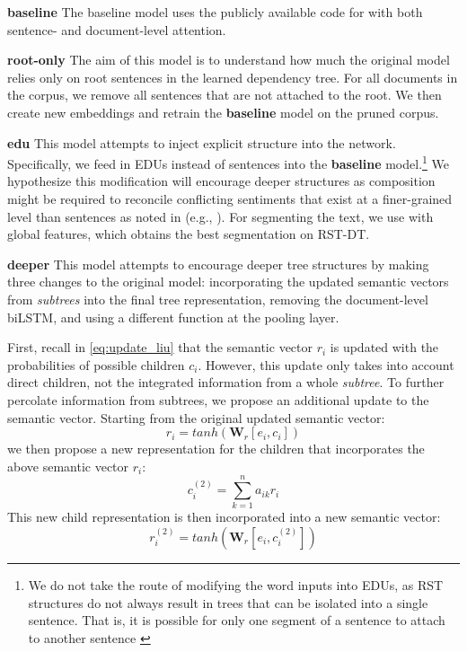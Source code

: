 \smallskip
\noindent\textbf{baseline} The baseline model uses the publicly available code for  with both sentence- and document-level attention. 

\smallskip
\noindent\textbf{root-only} The aim of this model is to understand how much the original model relies only on root sentences in the learned dependency tree. For all documents in the corpus, we remove all sentences that are not attached to the root. We then create new embeddings and retrain the \textbf{baseline} model on the pruned corpus.

\smallskip
\noindent\textbf{edu} This model attempts to inject explicit structure into the network. Specifically, we feed in EDUs instead of sentences into the \textbf{baseline} model.\footnote{We do not take the route of modifying the word inputs into EDUs, as RST structures do not always result in trees that can be isolated into a single sentence. That is, it is possible for only one segment of a sentence to attach to another sentence \cite{vanderVliet:2011}} We hypothesize this modification will encourage deeper structures as composition might be required to reconcile conflicting sentiments that exist at a finer-grained level than sentences as noted in  (e.g., ).
For segmenting the text, we use  with global features, which obtains the best segmentation on RST-DT. 

\smallskip
\noindent\textbf{deeper} This model attempts to encourage deeper tree structures by making three changes to the original model: incorporating the updated semantic vectors from \emph{subtrees} into the final tree representation, removing the document-level biLSTM, and using a different function at the pooling layer. 

First, recall in \ref{eq:update_liu} that the semantic vector $r_i$ is updated with the probabilities of possible children $c_i$. However, this update only takes into account direct children, not the integrated information from a whole \emph{subtree}. To further percolate information from subtrees, we propose an additional update to the semantic vector. Starting from the original updated semantic vector:
\begin{equation}
r_i = tanh(\textbf{W}_r[e_i, c_i])
\end{equation}
we then propose a new representation for the children that incorporates the above semantic vector $r_i$:
\begin{equation}
c_i^{(2)} = \sum^n_{k=1}a_{ik}r_i
\end{equation}
This new child representation is then incorporated into a new semantic vector:
\begin{equation}
r_i^{(2)} = tanh(\textbf{W}_r[e_i, c_i^{(2)}])
\end{equation}

